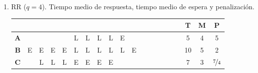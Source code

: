 \begin{ejercicio}
\begin{enumerate}
        \item RR ($q=4$). Tiempo medio de respuesta, tiempo medio de espera y penalización.
        \begin{table}[H]
            \begin{tabular}{ccccccccccccccccc|ccc}
                                            &                        &                                &                                &                                &                        &                        &                                &                                &                                &                         &                         &                                &                                &                                &                         &    & \textbf{T} & \textbf{M} & \textbf{P} \\ \hline
            \multicolumn{1}{c|}{\textbf{A}} &                        &                                &                                &                                & L                      & L                      & L                              & L                              & E                              &                         &                         &                                &                                &                                &                         &    & 5          & 4          & 5          \\ \hline
            \multicolumn{1}{c|}{\textbf{B}} & E                      & E                              & E                              & E                              & L                      & L                      & L                              & L                              & L                              & E                       &                         &                                &                                &                                &                         &    & 10         & 5          & 2          \\ \hline
            \multicolumn{1}{c|}{\textbf{C}} &                        & L                              & L                              & L                              & E                      & E                      & E                              & E                              &                                &                         &                         &                                &                                &                                &                         &    & 7          & 3          & $\nicefrac{7}{4}$        \\ \hline

\end{tabular}
\end{table}
\end{enumerate}
\end{ejercicio}
